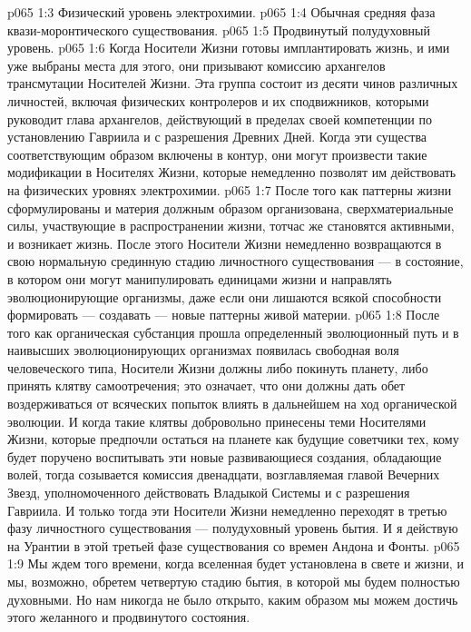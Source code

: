 \vs p065 1:3 \bibnobreakspace Физический уровень электрохимии.
\vs p065 1:4 \bibnobreakspace Обычная средняя фаза квази\hyp{}моронтического существования.
\vs p065 1:5 \bibnobreakspace Продвинутый полудуховный уровень.
\vs p065 1:6 \pc Когда Носители Жизни готовы имплантировать жизнь, и ими уже выбраны места для этого, они призывают комиссию архангелов трансмутации Носителей Жизни. Эта группа состоит из десяти чинов различных личностей, включая физических контролеров и их сподвижников, которыми руководит глава архангелов, действующий в пределах своей компетенции по установлению Гавриила и с разрешения Древних Дней. Когда эти существа соответствующим образом включены в контур, они могут произвести такие модификации в Носителях Жизни, которые немедленно позволят им действовать на физических уровнях электрохимии.
\vs p065 1:7 После того как паттерны жизни сформулированы и материя должным образом организована, сверхматериальные силы, участвующие в распространении жизни, тотчас же становятся активными, и возникает жизнь. После этого Носители Жизни немедленно возвращаются в свою нормальную срединную стадию личностного существования --- в состояние, в котором они могут манипулировать единицами жизни и направлять эволюционирующие организмы, даже если они лишаются всякой способности формировать --- создавать --- новые паттерны живой материи.
\vs p065 1:8 После того как органическая субстанция прошла определенный эволюционный путь и в наивысших эволюционирующих организмах появилась свободная воля человеческого типа, Носители Жизни должны либо покинуть планету, либо принять клятву самоотречения; это означает, что они должны дать обет воздерживаться от всяческих попыток влиять в дальнейшем на ход органической эволюции. И когда такие клятвы добровольно принесены теми Носителями Жизни, которые предпочли остаться на планете как будущие советчики тех, кому будет поручено воспитывать эти новые развивающиеся создания, обладающие волей, тогда созывается комиссия двенадцати, возглавляемая главой Вечерних Звезд, уполномоченного действовать Владыкой Системы и с разрешения Гавриила. И только тогда эти Носители Жизни немедленно переходят в третью фазу личностного существования --- полудуховный уровень бытия. И я действую на Урантии в этой третьей фазе существования со времен Андона и Фонты.
\vs p065 1:9 Мы ждем того времени, когда вселенная будет установлена в свете и жизни, и мы, возможно, обретем четвертую стадию бытия, в которой мы будем полностью духовными. Но нам никогда не было открыто, каким образом мы можем достичь этого желанного и продвинутого состояния.
